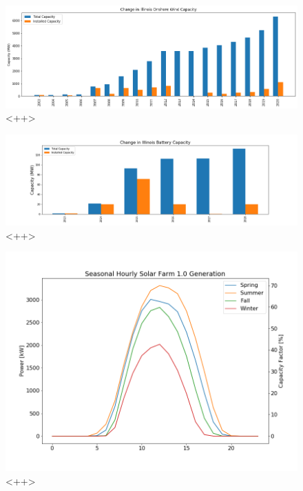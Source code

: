 \begin{figure}[ht]
	\centering
	\includegraphics[width=\columnwidth]{./img/annual_installed_cap_utilitywind.png}
        \caption{<++>}
	\label{fig:<++>}
\end{figure}



\begin{figure}[ht]
	\centering
        \includegraphics[width=\columnwidth]{./img/cap/battery.png}
	\caption{<++>}
	\label{fig:<++>}
\end{figure}

\begin{figure}[ht]
	\centering
	\includegraphics[width=\columnwidth]{./img/cap/seasonal_hourly_solar.png}
	\caption{<++>}
	\label{fig:<++>}
\end{figure}

